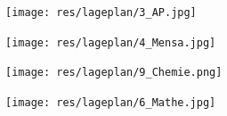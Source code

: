 {\vspace{1ex}

\begin{minipage}[c]{0.45\textwidth}
	\texttt{[image: res/lageplan/3\_AP.jpg]}
\end{minipage}
\hfill
\begin{minipage}[c]{0.45\textwidth}
	\texttt{[image: res/lageplan/4\_Mensa.jpg]}
\end{minipage}

\begin{minipage}[c]{0.45\textwidth}
	\texttt{[image: res/lageplan/9\_Chemie.png]}
\end{minipage}
\hfill
\begin{minipage}[c]{0.45\textwidth}
	\texttt{[image: res/lageplan/6\_Mathe.jpg]}
\end{minipage}

}
